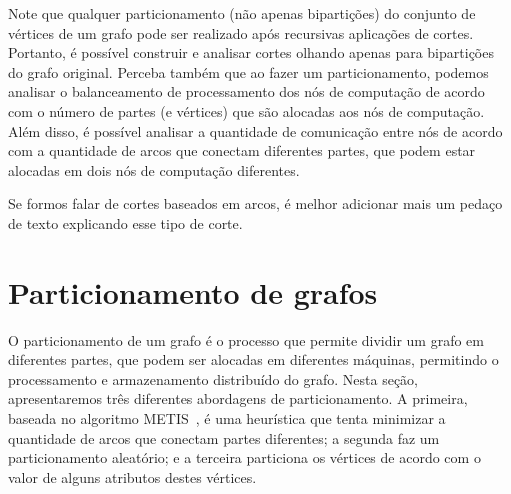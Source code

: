 \documentclass[conference]{IEEEtran}
\begin{document}
Note que qualquer particionamento (não apenas bipartições) do conjunto
de vértices de um grafo pode ser realizado após recursivas aplicações de
cortes. Portanto, é possível construir e analisar cortes olhando apenas
para bipartições do grafo original. Perceba também que ao fazer um
particionamento, podemos analisar o balanceamento de processamento
dos nós de computação de acordo com o número de partes (e vértices)
que são alocadas aos nós de computação. Além disso, é possível analisar
a quantidade de comunicação entre nós de acordo com a quantidade de
arcos que conectam diferentes partes, que podem estar alocadas em dois
nós de computação diferentes.

{\color{blue} Se formos falar de cortes baseados em arcos, é melhor
adicionar mais um pedaço de texto explicando esse tipo de corte.}

\section{Particionamento de grafos}
O particionamento de um grafo é o processo que permite dividir um grafo
em diferentes partes, que podem ser alocadas em diferentes máquinas,
permitindo o processamento e armazenamento distribuído do grafo. Nesta
seção, apresentaremos três diferentes abordagens de particionamento.
A primeira, baseada no algoritmo METIS~\cite{metis}, é uma heurística
que tenta minimizar a quantidade de arcos que conectam partes
diferentes; a segunda faz um particionamento aleatório; e a terceira
particiona os vértices de acordo com o valor de alguns atributos destes
vértices.
\end{document}
